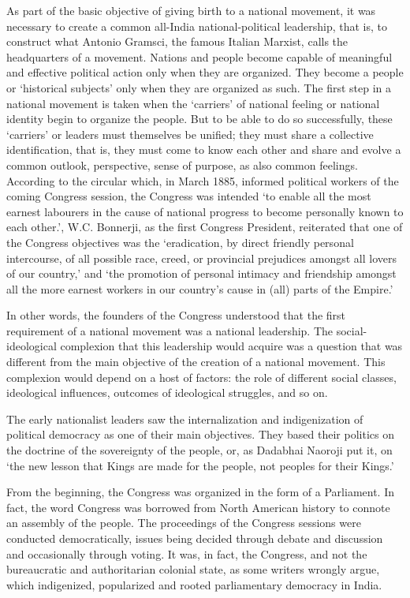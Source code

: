 As part of the basic objective of giving birth to a national movement, it was necessary to create a common all-India national-political leadership, that is, to construct what Antonio Gramsci, the famous Italian Marxist, calls the headquarters of a movement. Nations and people become capable of meaningful and effective political action only when they are organized. They become a people or `historical subjects' only when they are organized as such. The first step in a national movement is taken when the `carriers' of national feeling or national identity begin to organize the people. But to be able to do so successfully, these `carriers' or leaders must themselves be unified; they must share a collective identification, that is, they must come to know each other and share and evolve a common outlook, perspective, sense of purpose, as also common feelings. According to the circular which, in March 1885, informed political workers of the coming Congress session, the Congress was intended `to enable all the most earnest labourers in the cause of national progress to become personally known to each other.', W.C. Bonnerji, as the first Congress President, reiterated that one of the Congress objectives was the `eradication, by direct friendly personal intercourse, of all possible race, creed, or provincial prejudices amongst all lovers of our country,' and `the promotion of personal intimacy and friendship amongst all the more earnest workers in our country's cause in (all) parts of the Empire.'

In other words, the founders of the Congress understood that the first requirement of a national movement was a national leadership. The social- ideological complexion that this leadership would acquire was a question that was different from the main objective of the creation of a national movement. This complexion would depend on a host of factors: the role of different social classes, ideological influences, outcomes of ideological struggles, and so on.

The early nationalist leaders saw the internalization and indigenization of political democracy as one of their main objectives. They based their politics on the doctrine of the sovereignty of the people, or, as Dadabhai Naoroji put it, on `the new lesson that Kings are made for the people, not peoples for their Kings.'

From the beginning, the Congress was organized in the form of a Parliament. In fact, the word Congress was borrowed from North American history to connote an assembly of the people. The proceedings of the Congress sessions were conducted democratically, issues being decided through debate and discussion and occasionally through voting. It was, in fact, the Congress, and not the bureaucratic and authoritarian colonial state, as some writers wrongly argue, which indigenized, popularized and rooted parliamentary democracy in India.

